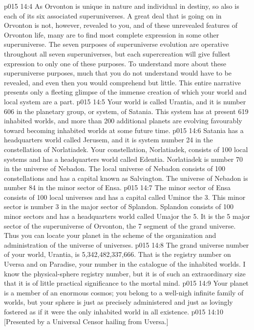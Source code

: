 \vs p015 14:4 As Orvonton is unique in nature and individual in destiny, so also is each of its six associated superuniverses. A great deal that is going on in Orvonton is not, however, revealed to you, and of these unrevealed features of Orvonton life, many are to find most complete expression in some other superuniverse. The seven purposes of superuniverse evolution are operative throughout all seven superuniverses, but each supercreation will give fullest expression to only one of these purposes. To understand more about these superuniverse purposes, much that you do not understand would have to be revealed, and even then you would comprehend but little. This entire narrative presents only a fleeting glimpse of the immense creation of which your world and local system are a part.
\vs p015 14:5 \pc Your world is called Urantia, and it is number 606 in the planetary group, or system, of Satania. This system has at present 619 inhabited worlds, and more than 200 additional planets are evolving favourably toward becoming inhabited worlds at some future time.
\vs p015 14:6 Satania has a headquarters world called Jerusem, and it is system number 24 in the constellation of Norlatiadek. Your constellation, Norlatiadek, consists of 100 local systems and has a headquarters world called Edentia. Norlatiadek is number 70 in the universe of Nebadon. The local universe of Nebadon consists of 100 constellations and has a capital known as Salvington. The universe of Nebadon is number 84 in the minor sector of Ensa.
\vs p015 14:7 The minor sector of Ensa consists of 100 local universes and has a capital called Uminor the 3. This minor sector is number 3 in the major sector of Splandon. Splandon consists of 100 minor sectors and has a headquarters world called Umajor the 5. It is the 5 major sector of the superuniverse of Orvonton, the 7 segment of the grand universe. Thus you can locate your planet in the scheme of the organization and administration of the universe of universes.
\vs p015 14:8 The grand universe number of your world, Urantia, is 5,342,482,337,666. That is the registry number on Uversa and on Paradise, your number in the catalogue of the inhabited worlds. I know the physical\hyp{}sphere registry number, but it is of such an extraordinary size that it is of little practical significance to the mortal mind.
\vs p015 14:9 \pc Your planet is a member of an enormous cosmos; you belong to a well\hyp{}nigh infinite family of worlds, but your sphere is just as precisely administered and just as lovingly fostered as if it were the only inhabited world in all existence.
\vsetoff
\vs p015 14:10 [Presented by a Universal Censor hailing from Uversa.]
